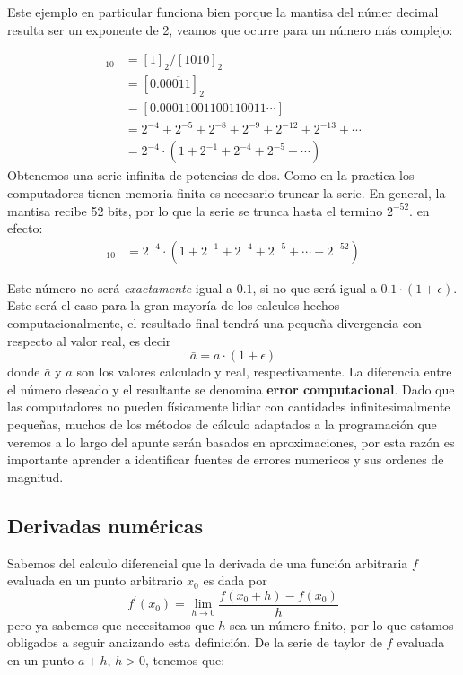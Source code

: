Este ejemplo en particular funciona bien porque la mantisa del númer decimal resulta ser un exponente de 2, veamos que ocurre para un número más complejo:

\begin{align*}
  [0.1]_{10} &= [1]_{2}/[1010]_{2} \\
             &= [0.0\overline{0011}]_{2} \\
             &= [0.00011001100110011 \cdots] \\
             &= 2^{-4} + 2^{-5} + 2^{-8} + 2^{-9} + 2^{-12} + 2^{-13} + \cdots \\
             &= 2^{-4}\cdot (1+ 2^{-1} + 2^{-4} + 2^{-5} + \cdots)
\end{align*}
Obtenemos una serie infinita de potencias de dos. Como en la practica los computadores tienen memoria finita es necesario truncar la serie. En general, la mantisa recibe 52 bits, por lo que la serie se trunca hasta el termino $2^{-52}$. en efecto:
\begin{align*}
  [0.1]_{10} &= 2^{-4}\cdot(1+ 2^{-1} + 2^{-4} + 2^{-5} + \cdots + 2^{-52})
\end{align*}

Este número no será \textit{exactamente} igual a $0.1$, si no que será igual a $0.1 \cdot (1+ \epsilon)$. Este será el caso para la gran mayoría de los calculos hechos computacionalmente, el resultado final tendrá una pequeña divergencia con respecto al valor real, es decir 
$$\bar{a} = a\cdot (1+ \epsilon) $$
donde $\bar{a}$ y $a$ son los valores calculado y real, respectivamente. La diferencia entre el número deseado y el resultante se denomina \textbf{error computacional}. Dado que las computadores no pueden físicamente lidiar con cantidades infinitesimalmente pequeñas, muchos de los métodos de cálculo adaptados a la programación que veremos a lo largo del apunte serán basados en aproximaciones, por esta razón es importante aprender a identificar fuentes de errores numericos y sus ordenes de magnitud.

\subsection{Derivadas numéricas}

Sabemos del calculo diferencial que la derivada de una función arbitraria $f$ evaluada en un punto arbitrario $x_{0}$  es dada por
\begin{equation}
  f^{\prime}(x_{0}) = \lim_{h \to 0} \frac{f(x_{0}+h) - f(x_{0})}{h}
\end{equation}
pero ya sabemos que necesitamos que $h$ sea un número finito, por lo que estamos obligados a seguir anaizando esta definición. De la serie de taylor de $f$ evaluada en un punto $a + h$, $h > 0$, tenemos que:

